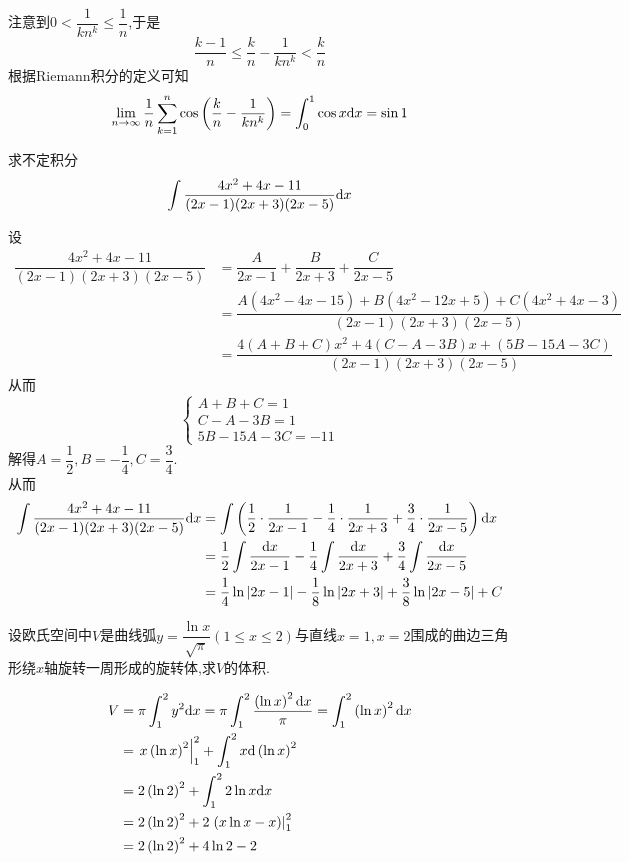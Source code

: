\documentclass{ctexart}
\begin{document}
\begin{solution}[Solution.]
    注意到$0<\dfrac{1}{kn^k}\leqslant\dfrac{1}{n}$,于是
    $$\dfrac{k-1}{n}\leqslant\dfrac{k}{n}-\dfrac{1}{kn^k}<\dfrac{k}{n}$$
    根据Riemann积分的定义可知
    $$\lim_{n\to\infty}\dfrac{1}{n}\sum_{k=1}^{n}\cos\left(\dfrac{k}{n}-\dfrac{1}{kn^k}\right)=\int_0^1\cos x\mathrm{d} x=\sin 1$$
\end{solution}
\begin{problem}[5.(15\songti{分})]
    求不定积分$$\int{\dfrac{4x^2+4x-11}{(2x-1)(2x+3)(2x-5)}\mathrm{d}x}$$
\end{problem}
\begin{solution}[Solution.]
    设
    \begin{align*}
        \dfrac{4x^2+4x-11}{(2x-1)(2x+3)(2x-5)}
        &= \dfrac{A}{2x-1}+\dfrac{B}{2x+3}+\dfrac{C}{2x-5} \\
        &= \dfrac{A(4x^2-4x-15)+B(4x^2-12x+5)+C(4x^2+4x-3)}{(2x-1)(2x+3)(2x-5)} \\
        &= \dfrac{4(A+B+C)x^2+4(C-A-3B)x+(5B-15A-3C)}{(2x-1)(2x+3)(2x-5)}
    \end{align*}
    从而$$\left\{\begin{array}{l}
        A+B+C=1 \\
        C-A-3B=1 \\
        5B-15A-3C=-11
    \end{array}\right.$$
    解得$A=\dfrac{1}{2},B=-\dfrac{1}{4},C=\dfrac{3}{4}$.\\
    从而\begin{align*}
        \int{\dfrac{4x^2+4x-11}{(2x-1)(2x+3)(2x-5)}\mathrm{d}x}
        &= \int\left(\dfrac{1}{2}\cdot\dfrac{1}{2x-1}-\dfrac{1}{4}\cdot\dfrac{1}{2x+3}+\dfrac{3}{4}\cdot\dfrac{1}{2x-5}\right)\mathrm{d} x\\
        &= \dfrac{1}{2}\int{\dfrac{\mathrm{d}x}{2x-1}}-\dfrac{1}{4}\int{\dfrac{\mathrm{d}x}{2x+3}}+\dfrac{3}{4}\int{\dfrac{\mathrm{d}x}{2x-5}} \\
        &= \dfrac{1}{4}\ln{\left|2x-1\right|}-\dfrac{1}{8}\ln{\left|2x+3\right|}+\dfrac{3}{8}\ln{\left|2x-5\right|}+C
    \end{align*}
\end{solution}
\begin{problem}[6.(10\songti{分})]
    设欧氏空间中$V$是曲线弧$\displaystyle y=\dfrac{\ln{x}}{\sqrt{\pi}}(1\leqslant x\leqslant 2)$与直线$x=1,x=2$围成的曲边三角形绕$x$轴旋转一周形成的旋转体,求$V$的体积.
\end{problem}
\begin{solution}[Solution.]
    \begin{align*}
        V
        &= \pi\int_1^2{y^2\mathrm{d} x}=\pi\int_1^2{\dfrac{\left(\ln x\right)^2\mathrm{d} x}{\pi}}=\int_1^2\left(\ln x\right)^2\mathrm{d} x \\
        &= \left.x\left(\ln x\right)^2\right|_1^2+\int_1^2x\mathrm{d}\left(\ln x\right)^2 \\
        &= 2\left(\ln 2\right)^2+\int_1^2 2\ln x\mathrm{d} x \\
        &= 2\left(\ln 2\right)^2+2\left.\left(x\ln x-x\right)\right|_1^2 \\
        &= 2\left(\ln 2\right)^2+4\ln2-2
    \end{align*}
\end{solution}
\end{document}
